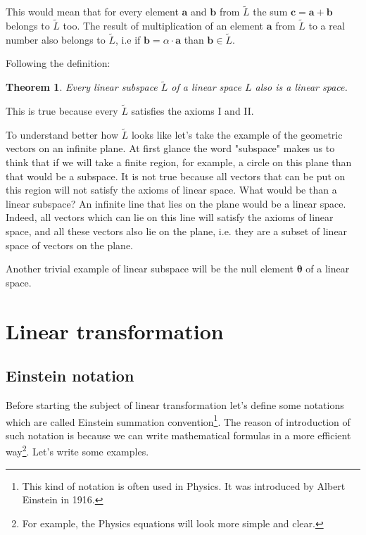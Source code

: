 \documentclass{book}
\newtheorem{theorem}{Theorem}
\begin{document}
This would mean that for every element $\boldsymbol{a}$ and $\boldsymbol{b}$ from $\widetilde{L}$ the sum $\boldsymbol{c} = \boldsymbol{a} + \boldsymbol{b}$ belongs to $\widetilde{L}$ too. The result of multiplication of an element $\boldsymbol{a}$ from $\widetilde{L}$ to a real number also belongs to $\widetilde{L}$, i.e if $\boldsymbol{b} = \alpha\cdot\boldsymbol{a}$ than $\boldsymbol{b} \in \widetilde{L}$.

Following the definition:

\begin{theorem}
Every linear subspace $\widetilde{L}$ of a linear space $L$ also is a linear space.
\end{theorem}

This is true because every $\widetilde{L}$ satisfies the axioms I and II.

To understand better how $\widetilde{L}$ looks like let's take the example of the geometric vectors on an infinite plane. At first glance the word "subspace" makes us to think that if we will take a finite region, for example, a circle on this plane than that would be a subspace. It is not true because all vectors that can be put on this region will not satisfy the axioms of linear space. What would be than a linear subspace? An infinite line that lies on the plane would be a linear space. Indeed, all vectors which can lie on this line will satisfy the axioms of linear space, and all these vectors also lie on the plane, i.e. they are a subset of linear space of vectors on the plane.

Another trivial example of linear subspace will be the null element $\boldsymbol{\theta}$ of a linear space.

\section{Linear transformation}

\subsection{Einstein notation}

Before starting the subject of linear transformation let's define some notations which are called Einstein summation convention\footnote{This kind of notation is often used in Physics. It was introduced by Albert Einstein in 1916.}. The reason of introduction of such notation is because we can write mathematical formulas in a more efficient way\footnote{For example, the Physics equations will look more simple and clear.}. Let's write some examples.
\end{document}
